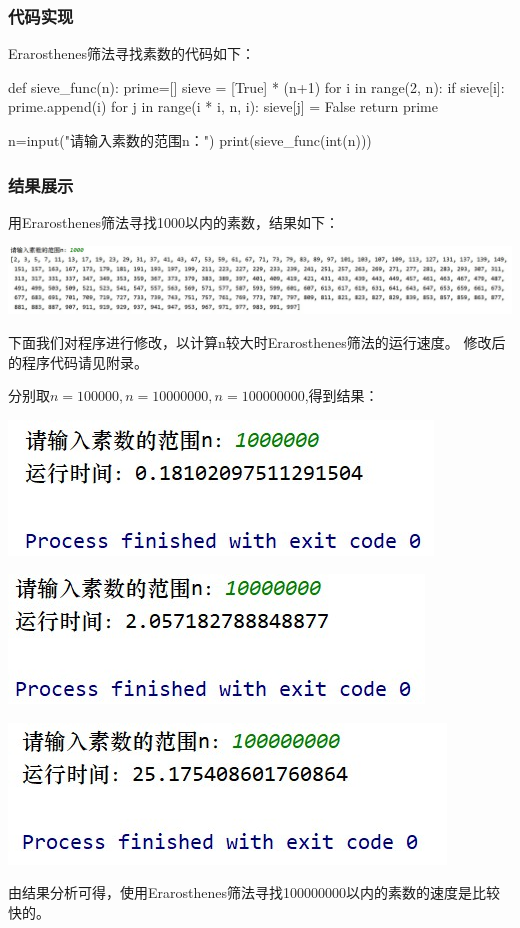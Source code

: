 \documentclass[UTF8]{ctexart}
\begin{document}
\subsubsection{代码实现}
\par Erarosthenes筛法寻找素数的代码如下：
\begin{python}
def sieve_func(n):
    prime=[]
    sieve = [True] * (n+1)
    for i in range(2, n):
        if sieve[i]:
            prime.append(i)
            for j in range(i * i, n, i):
                sieve[j] = False
    return prime

n=input("请输入素数的范围n：")
print(sieve_func(int(n)))
\end{python}
\subsubsection{结果展示}
\par 用Erarosthenes筛法寻找1000以内的素数，结果如下：
\par 
\includegraphics[width=.9\textwidth]{2.3.jpg}
\par 下面我们对程序进行修改，以计算n较大时Erarosthenes筛法的运行速度。
修改后的程序代码请见附录。
\par 分别取$n=100000,n=10000000,n=100000000$,得到结果：
\par
\includegraphics[width=.4\textwidth]{2.4.jpg}
\par
\includegraphics[width=.4\textwidth]{2.5.jpg}
\par
\includegraphics[width=.4\textwidth]{2.6.jpg}
\par 由结果分析可得，使用Erarosthenes筛法寻找100000000以内的素数的速度是比较快的。
\end{document}
